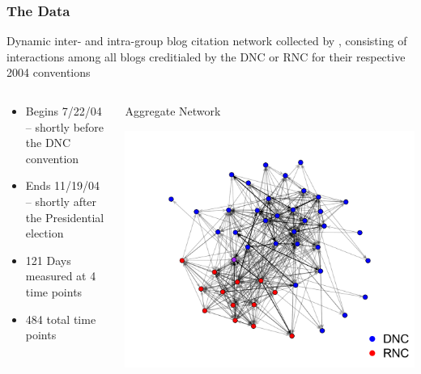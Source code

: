 \documentclass{beamer}
\begin{document}
\begin{frame}
\frametitle{The Data}

\begin{block}{}
Dynamic inter- and intra-group blog citation network collected by \citet{butts09b}, consisting of interactions among all blogs creditialed by the DNC or RNC for their respective 2004 conventions
\end{block}

\begin{columns}


\begin{block}{}
\begin{itemize}
\item Begins 7/22/04 -- shortly before the DNC convention
\item Ends 11/19/04 -- shortly after the Presidential election
\item 121 Days measured at 4 time points
\item 484 total time points
\end{itemize}
\end{block}



\begin{block}{Aggregate Network}

\includegraphics[width=.85\linewidth]{graphics/combinedGraph}

\end{block}

\end{columns}

\end{frame}
\end{document}
